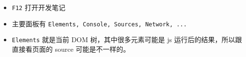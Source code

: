 

\begin{issues}
\issueDraft
\end{issues}

\begin{itemize}
\item \verb`F12` 打开开发笔记
\item 主要面板有 \verb`Elements, Console, Sources, Network, ...`
\item \verb`Elements` 就是当前 DOM 树，其中很多元素可能是 js 运行后的结果，所以跟直接看页面的 source 可能是不一样的。
\end{itemize}

